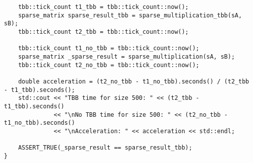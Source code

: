 \documentclass{report}
\begin{document}
\begin{lstlisting}
    tbb::tick_count t1_tbb = tbb::tick_count::now();
    sparse_matrix sparse_result_tbb = sparse_multiplication_tbb(sA, sB);
    tbb::tick_count t2_tbb = tbb::tick_count::now();

    tbb::tick_count t1_no_tbb = tbb::tick_count::now();
    sparse_matrix _sparse_result = sparse_multiplication(sA, sB);
    tbb::tick_count t2_no_tbb = tbb::tick_count::now();

    double acceleration = (t2_no_tbb - t1_no_tbb).seconds() / (t2_tbb - t1_tbb).seconds();
    std::cout << "TBB time for size 500: " << (t2_tbb - t1_tbb).seconds()
              << "\nNo TBB time for size 500: " << (t2_no_tbb - t1_no_tbb).seconds()
              << "\nAcceleration: " << acceleration << std::endl;

    ASSERT_TRUE(_sparse_result == sparse_result_tbb);
}

\end{lstlisting}
\end{document}
